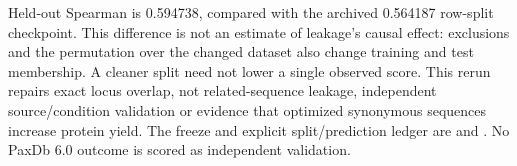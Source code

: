 Held-out Spearman is 0.594738, compared with the archived 0.564187 row-split checkpoint. This difference is not an estimate of leakage's causal effect: exclusions and the permutation over the changed dataset also change training and test membership. A cleaner split need not lower a single observed score. This rerun repairs exact locus overlap, not related-sequence leakage, independent source/condition validation or evidence that optimized synonymous sequences increase protein yield. The freeze and explicit split/prediction ledger are  and . No PaxDb 6.0 outcome is scored as independent validation.
